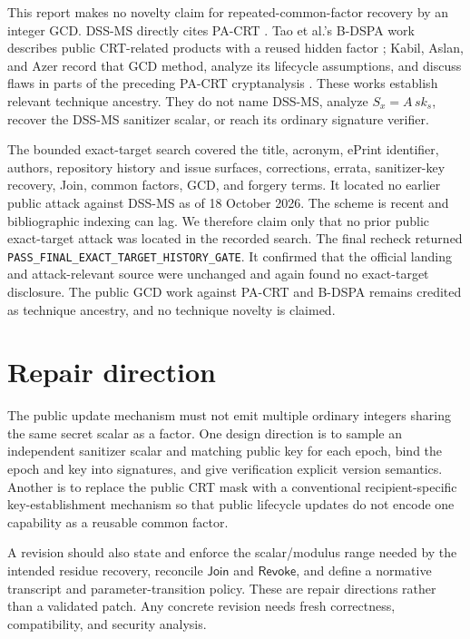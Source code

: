 \documentclass[10pt,a4paper]{article}
\newcommand{\DJoin}{\mathsf{Join}}
\begin{document}
This report makes no novelty claim for repeated-common-factor recovery by an
integer GCD. DSS-MS directly cites PA-CRT \cite{pacrt}. Tao et al.'s B-DSPA
work describes public CRT-related products with a reused hidden factor
\cite{bdspa}; Kabil, Aslan, and Azer record that GCD method, analyze its
lifecycle assumptions, and discuss flaws in parts of the preceding PA-CRT
cryptanalysis \cite{kabil}. These works establish relevant technique ancestry.
They do not name DSS-MS, analyze \(S_x=A\,sk_s\), recover the DSS-MS sanitizer
scalar, or reach its ordinary signature verifier.

The bounded exact-target search covered the title, acronym, ePrint identifier,
authors, repository history and issue surfaces, corrections, errata,
sanitizer-key recovery, Join, common factors, GCD, and forgery terms. It
located no earlier public attack against DSS-MS as of 18 October 2026. The
scheme is recent and bibliographic indexing can lag. We therefore claim only
that no prior public exact-target attack was located in the recorded search.
The final recheck returned
\texttt{PASS\_FINAL\_EXACT\_TARGET\_HISTORY\_GATE}. It confirmed that the
official landing and attack-relevant source were unchanged and again found no
exact-target disclosure. The public GCD work against PA-CRT and B-DSPA remains
credited as technique ancestry, and no technique novelty is claimed.

\section{Repair direction}

The public update mechanism must not emit multiple ordinary integers sharing
the same secret scalar as a factor. One design direction is to sample an
independent sanitizer scalar and matching public key for each epoch, bind the
epoch and key into signatures, and give verification explicit version
semantics. Another is to replace the public CRT mask with a conventional
recipient-specific key-establishment mechanism so that public lifecycle
updates do not encode one capability as a reusable common factor.

A revision should also state and enforce the scalar/modulus range needed by
the intended residue recovery, reconcile \(\DJoin\) and \(\mathsf{Revoke}\),
and define a normative transcript and parameter-transition policy. These are
repair directions rather than a validated patch. Any concrete revision needs
fresh correctness, compatibility, and security analysis.
\end{document}
